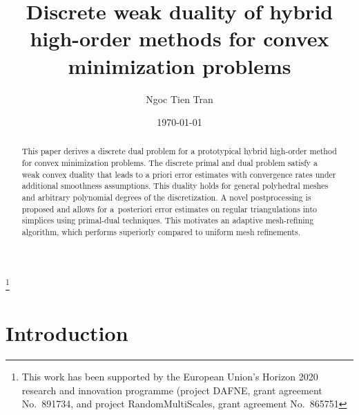 \documentclass[a4paper]{amsart}
\numberwithin{equation}{section}
\theoremstyle{remark}
\begin{document}
\title[Discrete weak convex duality of HHO methods]{Discrete weak duality of hybrid high-order methods for convex minimization problems}

\author[N.~T.~Tran]{Ngoc Tien Tran}

\thanks{This work has been supported by the European Union's Horizon 2020 research and innovation programme (project DAFNE, grant agreement No.~891734, and project RandomMultiScales, grant agreement No.~865751}

\address[N.~T.~Tran]{%
	Institut f\"ur Mathematik,
	Universit\"at Augsburg,
	86159 Augsburg}

\date{\today}



\begin{abstract}
	This paper derives a discrete dual problem for a prototypical hybrid high-order method for convex minimization problems. The discrete primal and dual problem satisfy a weak convex duality that leads to a priori error estimates with convergence rates under additional smoothness assumptions.
	This duality holds for general polyhedral meshes and arbitrary polynomial degrees of the discretization.
	A novel postprocessing is proposed and allows for a~posteriori error estimates on regular triangulations into simplices using primal-dual techniques. This motivates an adaptive mesh-refining algorithm, which performs superiorly compared to uniform mesh refinements.
\end{abstract}

\maketitle

\section{Introduction}
\end{document}
